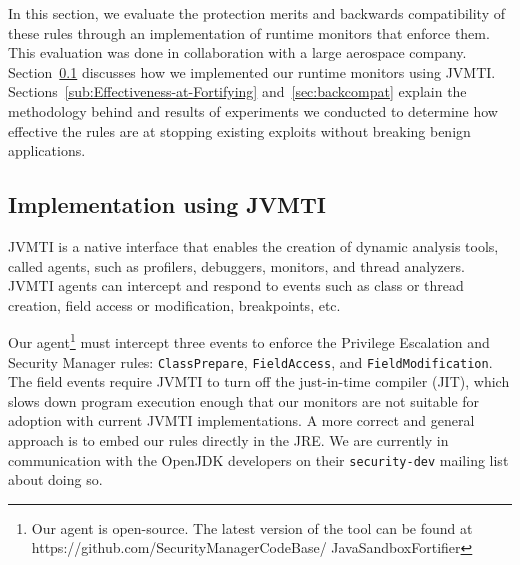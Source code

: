 \documentclass{sig-alternate}
\newcommand{\clg}[1]{\todo[color=yellow]{CLG: #1}}
\begin{document}


In this section, we evaluate the protection merits and backwards compatibility
of these rules through an implementation of runtime monitors that
enforce them. This evaluation was done in collaboration with a large aerospace
company.
Section~\ref{sub:Implementation-Using-JVMTI} discusses how we implemented
our runtime monitors using JVMTI. Sections~\ref{sub:Effectiveness-at-Fortifying} and~\ref{sec:backcompat} explain the methodology behind and results of experiments we conducted
to determine how effective the rules are at stopping existing exploits without
breaking benign applications. 

\subsection{Implementation using JVMTI}\label{sub:Implementation-Using-JVMTI}

JVMTI is a native interface that enables the creation of
dynamic analysis tools, called agents, such as profilers, debuggers, monitors, and thread
analyzers. JVMTI agents can intercept and respond to events such as class
or thread creation, field access or modification, breakpoints, etc.

Our agent\footnote{Our agent is open-source. The latest version
of the tool can be found at https://github.com/SecurityManagerCodeBase/
JavaSandboxFortifier} must intercept three events to enforce the Privilege Escalation
and Security Manager rules: \texttt{ClassPrepare}, \texttt{FieldAccess},
and \texttt{FieldModification}.
%
The field events require JVMTI to turn off the just-in-time compiler (JIT), which slows down program
execution enough that our monitors are not suitable for adoption with current 
JVMTI implementations. %
A more correct and general approach is to embed our
rules directly in the JRE.  We are currently in communication 
with the OpenJDK developers on their \texttt{security-dev} mailing list about
doing so.
\end{document}
